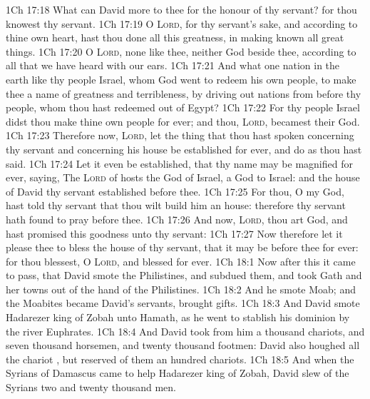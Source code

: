 \vs 1Ch 17:18 What can David  more to thee for the honour of thy servant? for thou knowest thy servant.
\vs 1Ch 17:19 O \textsc{Lord}, for thy servant's sake, and according to thine own heart, hast thou done all this greatness, in making known all  great things.
\vs 1Ch 17:20 O \textsc{Lord},  none like thee, neither  God beside thee, according to all that we have heard with our ears.
\vs 1Ch 17:21 And what one nation in the earth  like thy people Israel, whom God went to redeem  his own people, to make thee a name of greatness and terribleness, by driving out nations from before thy people, whom thou hast redeemed out of Egypt?
\vs 1Ch 17:22 For thy people Israel didst thou make thine own people for ever; and thou, \textsc{Lord}, becamest their God.
\vs 1Ch 17:23 Therefore now, \textsc{Lord}, let the thing that thou hast spoken concerning thy servant and concerning his house be established for ever, and do as thou hast said.
\vs 1Ch 17:24 Let it even be established, that thy name may be magnified for ever, saying, The \textsc{Lord} of hosts  the God of Israel,  a God to Israel: and  the house of David thy servant  established before thee.
\vs 1Ch 17:25 For thou, O my God, hast told thy servant that thou wilt build him an house: therefore thy servant hath found  to pray before thee.
\vs 1Ch 17:26 And now, \textsc{Lord}, thou art God, and hast promised this goodness unto thy servant:
\vs 1Ch 17:27 Now therefore let it please thee to bless the house of thy servant, that it may be before thee for ever: for thou blessest, O \textsc{Lord}, and  blessed for ever.
\vs 1Ch 18:1 Now after this it came to pass, that David smote the Philistines, and subdued them, and took Gath and her towns out of the hand of the Philistines.
\vs 1Ch 18:2 And he smote Moab; and the Moabites became David's servants,  brought gifts.
\vs 1Ch 18:3 And David smote Hadarezer king of Zobah unto Hamath, as he went to stablish his dominion by the river Euphrates.
\vs 1Ch 18:4 And David took from him a thousand chariots, and seven thousand horsemen, and twenty thousand footmen: David also houghed all the chariot , but reserved of them an hundred chariots.
\vs 1Ch 18:5 And when the Syrians of Damascus came to help Hadarezer king of Zobah, David slew of the Syrians two and twenty thousand men.
